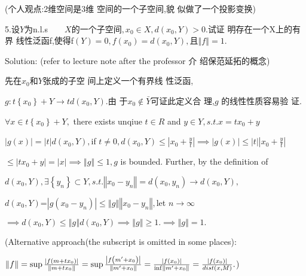 \documentclass{ctexart}
\begin{document}
(个人观点:2维空间是3维%
空间的一个子空间,貌%
似做了一个投影变换)

\bigskip

5.设$Y$为n.l.s$\qquad X的 一 个 子 
空 间 ,x_{0}\in X,d\left( x_{0},Y\right) >0.$试证%
明存在一个X上的有界%
线性泛函f,使得f$\left( Y\right)
=0,f\left( x_{0}\right) =d\left( x_{0},Y\right) ,$且$\left\Vert
f\right\Vert =1.$

\bigskip Solution: (refer to lecture note after the professor 介%
绍保范延拓的概念)

先在$x_{0}$和$Y$张成的子空%
间上定义一个有界线%
性泛函,

$g:t\left\{ x_{0}\right\} +Y\rightarrow td\left( x_{0},Y\right) .$由%
于$x_{0}\notin \bar{Y}$可证此定义合%
理,$g$ 的线性性质容易验%
证.

\bigskip $\forall x\in t\left\{ x_{0}\right\} +Y,$ there exists unqiue $t\in
R$ and $y\in Y,s.t.x=tx_{0}+y$

$\left\vert g\left( x\right) \right\vert =\left\vert t\right\vert d\left(
x_{0},Y\right) ,$if $t\neq 0,d\left( x_{0},Y\right) \leq \left\vert x_{0}+%
\frac{y}{t}\right\vert \implies \left\vert g\left( x\right) \right\vert \leq
\left\vert t\right\vert \left\vert x_{0}+\frac{y}{t}\right\vert $

$\leq \left\vert tx_{0}+y\right\vert =\left\vert x\right\vert \implies
\left\Vert g\right\Vert \leq 1,g$ is bounded. Further, by the definition of

$d\left( x_{0},Y\right) ,\exists \left\{ y_{n}\right\} \subset
Y,s.t.\left\Vert x_{0}-y_{n}\right\Vert =d\left( x_{0},y_{n}\right)
\rightarrow d\left( x_{0},Y\right) ,$

$d\left( x_{0},Y\right) $=$\left\vert g\left( x_{0}-y_{n}\right) \right\vert
\leq \left\Vert g\right\Vert \left\Vert x_{0}-y_{n}\right\Vert ,$let $%
n\rightarrow \infty $

$\implies d\left( x_{0},Y\right) \leq \left\Vert g\right\Vert d\left(
x_{0},Y\right) \implies \left\Vert g\right\Vert \geq 1.\implies \left\Vert
g\right\Vert =1.$

\bigskip (Alternative approach(the subscript is omitted in some places):

$\left\Vert f\right\Vert =\sup \frac{\left\vert f\left( m+tx_{0}\right)
\right\vert }{\left\Vert m+tx_{0}\right\Vert }=\sup \frac{\left\vert f\left(
m^{\prime }+x_{0}\right) \right\vert }{\left\Vert m^{\prime
}+x_{0}\right\Vert }=\frac{\left\vert f\left( x_{0}\right) \right\vert }{%
\inf \left\Vert m^{\prime }+x_{0}\right\Vert }=\frac{\left\vert f\left(
x_{0}\right) \right\vert }{dist\left( x,M\right) }.$)
\end{document}
